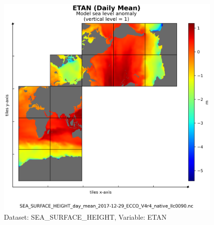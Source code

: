 \begin{figure}[H]
\centering
\includegraphics[scale=0.55]{../images/plots/v4r4/native_plots/Sea_Surface_Height/ETAN.png}
\caption{Dataset: SEA\_SURFACE\_HEIGHT, Variable: ETAN}
\label{tab:table-SEA_SURFACE_HEIGHT_ETAN-Plot}
\end{figure}
\newpage
\pagebreak
